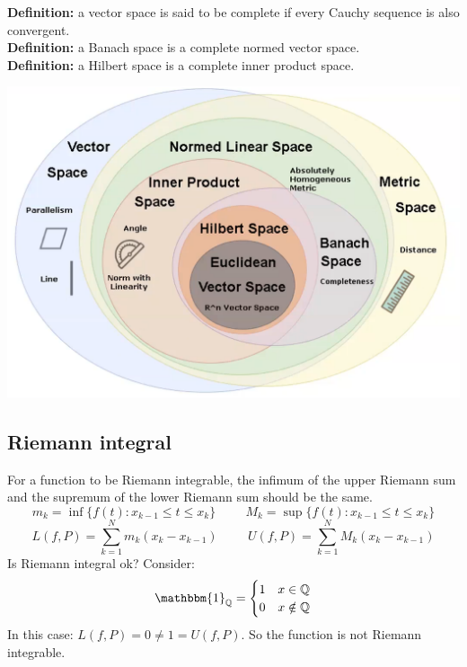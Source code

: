 \textbf{Definition:} a vector space is said to be complete if every Cauchy sequence is also convergent.\\

\textbf{Definition:} a Banach space is a complete normed vector space.\\

\textbf{Definition:} a Hilbert space is a complete inner product space.\\

\begin{center}
    \includegraphics[scale = 0.2]{../images/SetsSpace.png}
\end{center}

\subsection*{Riemann integral}
For a function to be Riemann integrable, the infimum of the upper Riemann sum and the supremum of the lower Riemann sum should be the same.
\[
    m_k = \inf\{f(t):x_{k-1} \leq t\leq x_k\} \hspace{1cm} M_k = \sup\{f(t):x_{k-1} \leq t\leq x_k\}    
\]
\[
    L(f,P) = \sum_{k=1}^N m_k(x_k - x_{k-1}) \hspace{1cm} U(f,P) = \sum_{k=1}^N M_k(x_k - x_{k-1})    
\]
Is Riemann integral ok? Consider:
\[
    \mathbbm{1}_{\mathbb{Q}} = \begin{cases}
        1 & x \in \mathbb{Q}\\
        0 & x \notin \mathbb{Q}
    \end{cases}    
\]
In this case: $L(f,P) = 0 \neq 1 = U(f,P)$. So the function is not Riemann integrable. 

